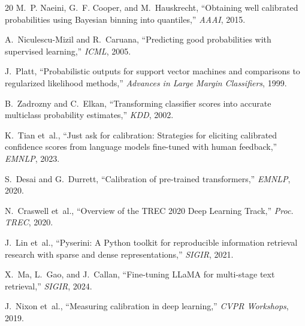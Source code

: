 \documentclass[conference]{IEEEtran}
\begin{document}
\begin{thebibliography}{20}
 M.~P. Naeini, G.~F. Cooper, and M.~Hauskrecht,
``Obtaining well calibrated probabilities using Bayesian binning into
quantiles,''
\emph{AAAI}, 2015.

 A.~Niculescu-Mizil and R.~Caruana,
``Predicting good probabilities with supervised learning,''
\emph{ICML}, 2005.

 J.~Platt,
``Probabilistic outputs for support vector machines and comparisons to
regularized likelihood methods,''
\emph{Advances in Large Margin Classifiers}, 1999.

 B.~Zadrozny and C.~Elkan,
``Transforming classifier scores into accurate multiclass probability
estimates,''
\emph{KDD}, 2002.

 K.~Tian et~al.,
``Just ask for calibration: Strategies for eliciting calibrated confidence
scores from language models fine-tuned with human feedback,''
\emph{EMNLP}, 2023.

 S.~Desai and G.~Durrett,
``Calibration of pre-trained transformers,''
\emph{EMNLP}, 2020.

 N.~Craswell et~al.,
``Overview of the TREC 2020 Deep Learning Track,''
\emph{Proc. TREC}, 2020.

 J.~Lin et~al.,
``Pyserini: A Python toolkit for reproducible information retrieval research
with sparse and dense representations,''
\emph{SIGIR}, 2021.

 X.~Ma, L.~Gao, and J.~Callan,
``Fine-tuning LLaMA for multi-stage text retrieval,''
\emph{SIGIR}, 2024.

 J.~Nixon et~al.,
``Measuring calibration in deep learning,''
\emph{CVPR Workshops}, 2019.

\end{thebibliography}
\end{document}
